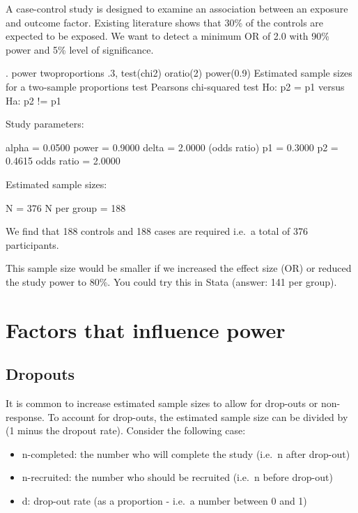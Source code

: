 \documentclass[
]{memoir}
\newenvironment{Shaded}{\begin{snugshade}}{\end{snugshade}}
\newcommand{\NormalTok}[1]{#1}
\providecommand{\tightlist}{%
  \setlength{\itemsep}{0pt}\setlength{\parskip}{0pt}}
\begin{document}
A case-control study is designed to examine an association between an exposure and outcome factor. Existing literature shows that 30\% of the controls are expected to be exposed. We want to detect a minimum OR of 2.0 with 90\% power and 5\% level of significance.

\begin{Shaded}
\begin{Highlighting}[]
\NormalTok{. power twoproportions .3, test(chi2) oratio(2) power(0.9)}
\NormalTok{Estimated sample sizes for a two{-}sample proportions test}
\NormalTok{Pearson\textquotesingle{}s chi{-}squared test }
\NormalTok{Ho: p2 = p1  versus  Ha: p2 != p1}

\NormalTok{Study parameters:}

\NormalTok{        alpha =    0.0500}
\NormalTok{        power =    0.9000}
\NormalTok{        delta =    2.0000  (odds ratio)}
\NormalTok{           p1 =    0.3000}
\NormalTok{           p2 =    0.4615}
\NormalTok{   odds ratio =    2.0000}

\NormalTok{Estimated sample sizes:}

\NormalTok{            N =       376}
\NormalTok{  N per group =       188}
\end{Highlighting}
\end{Shaded}

We find that 188 controls and 188 cases are required i.e.~a total of 376 participants.

This sample size would be smaller if we increased the effect size (OR) or reduced the study power to 80\%. You could try this in Stata (answer: 141 per group).

\hypertarget{factors-that-influence-power}{%
\section{Factors that influence power}\label{factors-that-influence-power}}

\hypertarget{dropouts}{%
\subsection{Dropouts}\label{dropouts}}

It is common to increase estimated sample sizes to allow for drop-outs or non-response. To account for drop-outs, the estimated sample size can be divided by (1 minus the dropout rate). Consider the following case:

\begin{itemize}
\tightlist
\item
  n-completed: the number who will complete the study (i.e.~n after drop-out)
\item
  n-recruited: the number who should be recruited (i.e.~n before drop-out)
\item
  d: drop-out rate (as a proportion - i.e.~a number between 0 and 1)
\end{itemize}
\end{document}
